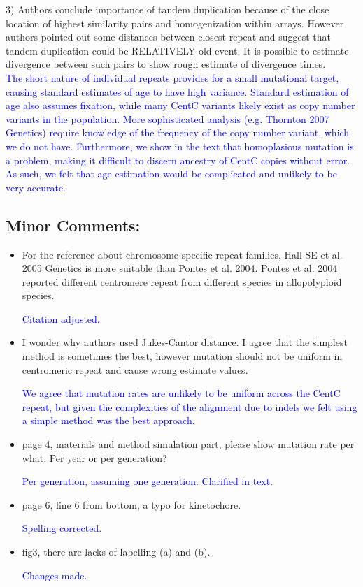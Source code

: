 \documentclass[]{article}
\newcommand{\res}[1]{\noindent \textcolor{blue}{{#1}} \\}
\begin{document}
3) Authors conclude importance of tandem duplication because of the close location of highest similarity pairs and homogenization within arrays. However authors pointed out some distances between closest repeat and suggest that tandem duplication could be RELATIVELY old event. It is possible to estimate divergence between such pairs to show rough estimate of divergence times.\\

\res{The short nature of individual repeats provides for a small mutational target, causing standard estimates of age to have high variance.  
Standard estimation of age also assumes fixation, while many CentC variants likely exist as copy number variants in the population. 
More sophisticated analysis (e.g. Thornton 2007 Genetics) require knowledge of the frequency of the copy number variant, which we do not have.
Furthermore, we show in the text that homoplasious mutation is a problem, making it difficult to discern ancestry of CentC copies without error.  
As such, we felt that age estimation would be complicated and unlikely to be very accurate.}

\subsection*{Minor Comments:}

\begin{itemize}
\item For the reference about chromosome specific repeat families, Hall SE et al. 2005 Genetics is more suitable than Pontes et al. 2004. Pontes et al. 2004 reported different centromere repeat from different species in allopolyploid species.

\res{Citation adjusted.}

\item I wonder why authors used Jukes-Cantor distance. I agree that the simplest method is sometimes the best, however mutation should not be uniform in centromeric repeat and cause wrong estimate values. 

\res{We agree that mutation rates are unlikely to be uniform across the CentC repeat, but given the complexities of the alignment due to indels we felt using a simple method was the best approach. }

\item page 4, materials and method simulation part, please show mutation rate per what. Per year or per generation? 

\res{Per generation, assuming one generation.  Clarified in text.}

\item page 6, line 6 from bottom, a typo for kinetochore.

\res{Spelling corrected.}

\item fig3, there are lacks of labelling (a) and (b). 

\res{Changes made.}

\end{itemize}
\end{document}
